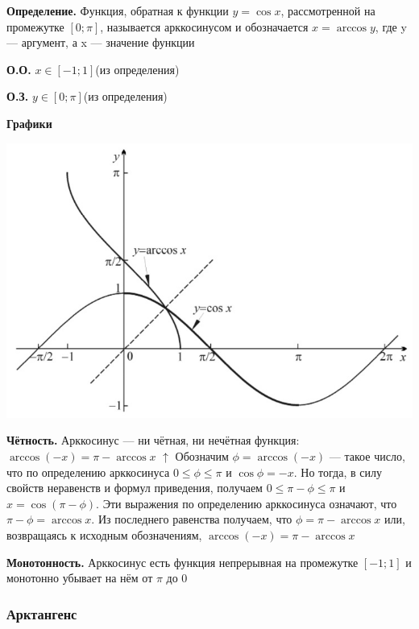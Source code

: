 \documentclass{article}
\begin{document}
        \textbf{Определение.} Функция, обратная к функции \(y = \cos x\), рассмотренной на промежутке \([0; \pi]\), называется арккосинусом и обозначается \(x = \arccos y\), где y --- аргумент, а x --- значение функции
        
        \textbf{О.О.} \(x \in [-1; 1]\)(из определения)
        
        \textbf{О.З.} \(y \in [0; \pi]\)(из определения)
        
        \textbf{Графики}
        \begin{center}
            \includegraphics[scale=0.4]{5}
        \end{center}
        
        \textbf{Чётность.} Арккосинус --- ни чётная, ни нечётная функция: \(\arccos{(-x)} = \pi - \arccos x\)
        \(\uparrow\) Обозначим \(\phi = \arccos{(-x)}\) --- такое число, что по определению арккосинуса \(0 \leq \phi \leq \pi\) и \(\cos{\phi} = -x\). Но тогда, в силу свойств неравенств и формул приведения, получаем
        \(0 \leq \pi-\phi \leq \pi\) и \(x = \cos{(\pi - \phi)}\). Эти выражения по определению арккосинуса означают, что \(\pi-\phi = \arccos x\).
        Из последнего равенства получаем, что \(\phi = \pi-\arccos x\) или, возвращаясь к исходным обозначениям, \(\arccos{(-x)} = \pi - \arccos x\)
        
        \textbf{Монотонность.} Арккосинус есть функция непрерывная на промежутке \([-1; 1]\) и монотонно убывает на нём от \(\pi\) до 0
        
        \subsubsection{Арктангенс}
        
\end{document}

